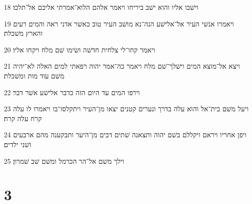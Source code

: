 \par 18 וישׁבו אליו והוא ישׁב ביריחו ויאמר אלהם הלוא־אמרתי אליכם אל־תלכו׃
\par 19 ויאמרו אנשׁי העיר אל־אלישׁע הנה־נא מושׁב העיר טוב כאשׁר אדני ראה והמים רעים והארץ משׁכלת׃
\par 20 ויאמר קחו־לי צלחית חדשׁה ושׂימו שׁם מלח ויקחו אליו׃
\par 21 ויצא אל־מוצא המים וישׁלך־שׁם מלח ויאמר כה־אמר יהוה רפאתי למים האלה לא־יהיה משׁם עוד מות ומשׁכלת׃
\par 22 וירפו המים עד היום הזה כדבר אלישׁע אשׁר דבר׃
\par 23 ויעל משׁם בית־אל והוא עלה בדרך ונערים קטנים יצאו מן־העיר ויתקלסו־בו ויאמרו לו עלה קרח עלה קרח׃
\par 24 ויפן אחריו ויראם ויקללם בשׁם יהוה ותצאנה שׁתים דבים מן־היער ותבקענה מהם ארבעים ושׁני ילדים׃
\par 25 וילך משׁם אל־הר הכרמל ומשׁם שׁב שׁמרון׃

\chapter{3}

